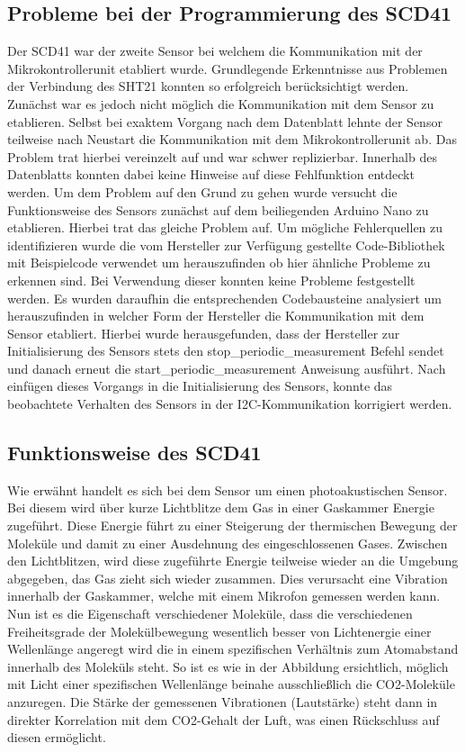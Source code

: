 \documentclass[]{article}
\begin{document}
		\subsection{Probleme bei der Programmierung des SCD41}
		Der SCD41 war der zweite Sensor bei welchem die Kommunikation mit der Mikrokontrollerunit etabliert wurde. Grundlegende Erkenntnisse aus Problemen der Verbindung des SHT21 konnten so erfolgreich berücksichtigt werden. Zunächst war es jedoch nicht möglich die Kommunikation mit dem Sensor zu etablieren. Selbst bei exaktem Vorgang nach dem Datenblatt lehnte der Sensor teilweise nach Neustart die Kommunikation mit dem Mikrokontrollerunit ab. Das Problem trat hierbei vereinzelt auf und war schwer replizierbar. Innerhalb des Datenblatts konnten dabei keine Hinweise auf diese Fehlfunktion entdeckt werden. Um dem Problem auf den Grund zu gehen wurde versucht die Funktionsweise des Sensors zunächst auf dem beiliegenden Arduino Nano zu etablieren. Hierbei trat das gleiche Problem auf. Um mögliche Fehlerquellen zu identifizieren wurde die vom Hersteller zur Verfügung gestellte Code-Bibliothek mit Beispielcode verwendet um herauszufinden ob hier ähnliche Probleme zu erkennen sind. Bei Verwendung dieser konnten keine Probleme festgestellt werden. Es wurden daraufhin die entsprechenden Codebausteine analysiert um herauszufinden in welcher Form der Hersteller die Kommunikation mit dem Sensor etabliert. Hierbei wurde herausgefunden, dass der Hersteller zur Initialisierung des Sensors stets den stop\_periodic\_measurement Befehl sendet und danach erneut die start\_periodic\_measurement Anweisung ausführt. Nach einfügen dieses Vorgangs in die Initialisierung des Sensors, konnte das beobachtete Verhalten des Sensors in der I2C-Kommunikation korrigiert werden. 
		
		\subsection{Funktionsweise des SCD41}
		Wie erwähnt handelt es sich bei dem Sensor um einen photoakustischen Sensor. Bei diesem wird über kurze Lichtblitze dem Gas in einer Gaskammer Energie zugeführt. Diese Energie führt zu einer Steigerung der thermischen Bewegung der Moleküle und damit zu einer Ausdehnung des eingeschlossenen Gases. Zwischen den Lichtblitzen, wird diese zugeführte Energie teilweise wieder an die Umgebung abgegeben, das Gas zieht sich wieder zusammen. Dies verursacht eine Vibration innerhalb der Gaskammer, welche mit einem Mikrofon gemessen werden kann. Nun ist es die Eigenschaft verschiedener Moleküle, dass die verschiedenen Freiheitsgrade der Molekülbewegung wesentlich besser von Lichtenergie einer Wellenlänge angeregt wird die in einem spezifischen Verhältnis zum Atomabstand innerhalb des Moleküls steht. So ist es wie in der Abbildung ersichtlich, möglich mit Licht einer spezifischen Wellenlänge beinahe ausschließlich die CO2-Moleküle anzuregen. Die Stärke der gemessenen Vibrationen (Lautstärke) steht dann in direkter Korrelation mit dem CO2-Gehalt der Luft, was einen Rückschluss auf diesen ermöglicht.
		
\end{document}
